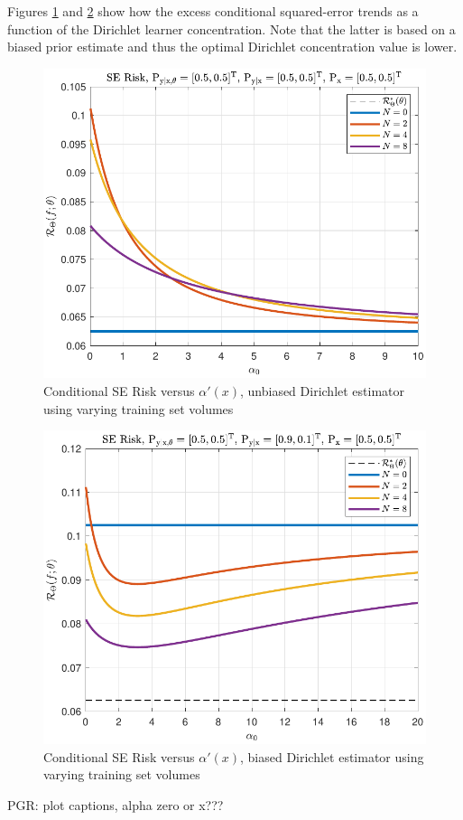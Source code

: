 \documentclass[12pt]{article}
\begin{document}
Figures \ref{fig:Risk_cond_SE_Dir_a0_leg_N_unbiased} and \ref{fig:Risk_cond_SE_Dir_a0_leg_N_biased} show how the excess conditional squared-error trends as a function of the Dirichlet learner concentration. Note that the latter is based on a biased prior estimate and thus the optimal Dirichlet concentration value is lower.
\begin{figure}
\centering
\includegraphics[width=0.7\linewidth]{Risk_cond_SE_Dir_a0_leg_N_unbiased.pdf}
\caption{Conditional SE Risk versus $\alpha'(x)$, unbiased Dirichlet estimator using varying training set volumes}
\label{fig:Risk_cond_SE_Dir_a0_leg_N_unbiased}
\end{figure}
\begin{figure}
\centering
\includegraphics[width=0.7\linewidth]{Risk_cond_SE_Dir_a0_leg_N_biased.pdf}
\caption{Conditional SE Risk versus $\alpha'(x)$, biased Dirichlet estimator using varying training set volumes}
\label{fig:Risk_cond_SE_Dir_a0_leg_N_biased}
\end{figure}

PGR: plot captions, alpha zero or x???
\end{document}
